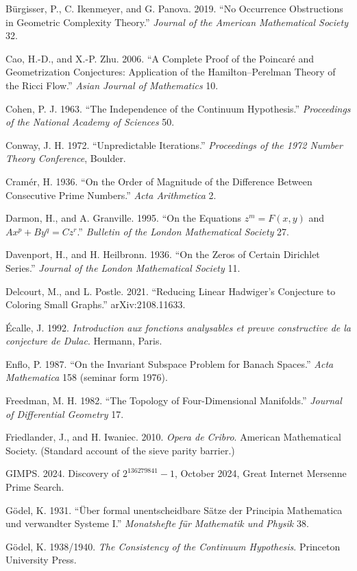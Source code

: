\documentclass[10pt]{article}
\renewcommand{\_}{\origunderscore\allowbreak}
\begin{document}
Bürgisser, P., C. Ikenmeyer, and G. Panova. 2019. ``No Occurrence
Obstructions in Geometric Complexity Theory.'' \emph{Journal of the
American Mathematical Society} 32.

Cao, H.-D., and X.-P. Zhu. 2006. ``A Complete Proof of the Poincaré and
Geometrization Conjectures: Application of the Hamilton--Perelman Theory
of the Ricci Flow.'' \emph{Asian Journal of Mathematics} 10.

Cohen, P. J. 1963. ``The Independence of the Continuum Hypothesis.''
\emph{Proceedings of the National Academy of Sciences} 50.

Conway, J. H. 1972. ``Unpredictable Iterations.'' \emph{Proceedings of
the 1972 Number Theory Conference}, Boulder.

Cramér, H. 1936. ``On the Order of Magnitude of the Difference Between
Consecutive Prime Numbers.'' \emph{Acta Arithmetica} 2.

Darmon, H., and A. Granville. 1995. ``On the Equations \(z^m = F(x, y)\)
and \(Ax^p + By^q = Cz^r\).'' \emph{Bulletin of the London Mathematical
Society} 27.

Davenport, H., and H. Heilbronn. 1936. ``On the Zeros of Certain
Dirichlet Series.'' \emph{Journal of the London Mathematical Society}
11.

Delcourt, M., and L. Postle. 2021. ``Reducing Linear Hadwiger's
Conjecture to Coloring Small Graphs.'' arXiv:2108.11633.

Écalle, J. 1992. \emph{Introduction aux fonctions analysables et preuve
constructive de la conjecture de Dulac}. Hermann, Paris.

Enflo, P. 1987. ``On the Invariant Subspace Problem for Banach Spaces.''
\emph{Acta Mathematica} 158 (seminar form 1976).

Freedman, M. H. 1982. ``The Topology of Four-Dimensional Manifolds.''
\emph{Journal of Differential Geometry} 17.

Friedlander, J., and H. Iwaniec. 2010. \emph{Opera de Cribro}. American
Mathematical Society. (Standard account of the sieve parity barrier.)

GIMPS. 2024. Discovery of \(2^{136279841} - 1\), October 2024, Great
Internet Mersenne Prime Search.

Gödel, K. 1931. ``Über formal unentscheidbare Sätze der Principia
Mathematica und verwandter Systeme I.'' \emph{Monatshefte für Mathematik
und Physik} 38.

Gödel, K. 1938/1940. \emph{The Consistency of the Continuum Hypothesis}.
Princeton University Press.
\end{document}
